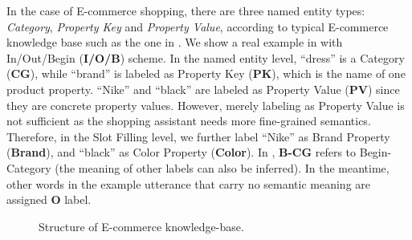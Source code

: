 In the case of E-commerce shopping, 
there are three named entity types: 
\emph{Category}, \emph{Property Key} and \emph{Property Value}, according to typical E-commerce knowledge base such as the one in .
We show a real example in 
with In/Out/Begin (\textbf{I/O/B}) scheme.
In the named entity level,
``dress'' is a Category (\textbf{CG}),
while ``brand'' is labeled as Property Key (\textbf{PK}),
which is the name of one product property.
``Nike'' and ``black'' are labeled as Property Value (\textbf{PV}) since they 
are concrete property values.
However, merely labeling as Property Value is not sufficient as
the shopping assistant needs more fine-grained semantics.
Therefore, in the Slot Filling level, 
we further label ``Nike'' as Brand Property (\textbf{Brand}), 
and ``black'' as Color Property (\textbf{Color}).
In , \textbf{B-CG} refers to 
Begin-Category (the meaning of other labels can also be inferred). 
In the meantime, other words in the example utterance that carry no semantic meaning are assigned \textbf{O} label.
\begin{figure}[th]
	\centering
	\caption{Structure of E-commerce knowledge-base.}
	\label{fig:kg}
\end{figure}
